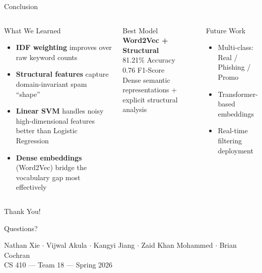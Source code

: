\documentclass[aspectratio=169, 12pt]{beamer}
\begin{document}
\begin{frame}{Conclusion}
\begin{columns}[T]
\begin{block}{What We Learned}
\begin{itemize}
    \item \textbf{IDF weighting} improves over raw keyword counts
    \item \textbf{Structural features} capture domain-invariant spam ``shape''
    \item \textbf{Linear SVM} handles noisy high-dimensional features better than Logistic Regression
    \item \textbf{Dense embeddings} (Word2Vec) bridge the vocabulary gap most effectively
\end{itemize}
\end{block}

\begin{exampleblock}{Best Model}
\centering
\large\textcolor{accentGreen}{\textbf{Word2Vec + Structural}}\\[6pt]
\normalsize
81.21\% Accuracy\\
0.76 F1-Score\\[6pt]
{\small Dense semantic representations + explicit structural analysis}
\end{exampleblock}

\vspace{6pt}
\begin{block}{\small Future Work}
\scriptsize
\begin{itemize}
    \item Multi-class: Real / Phishing / Promo
    \item Transformer-based embeddings
    \item Real-time filtering deployment
\end{itemize}
\end{block}
\end{columns}
\end{frame}

{
\begin{frame}[plain]
\vfill
\centering
{ Thank You!}

\vspace{16pt}
{\large\color{textLight} Questions?}

\vspace{24pt}
{\small\color{textMuted}
Nathan Xie $\cdot$ Vijwal Akula $\cdot$ Kangyi Jiang $\cdot$ Zaid Khan Mohammed $\cdot$ Brian Cochran\\[6pt]
CS 410 --- Team 18 --- Spring 2026}
\vfill
\end{frame}
}
\end{document}
